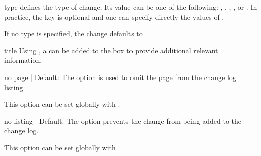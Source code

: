 \documentclass[11pt]{article}
\begin{document}
\begin{Optiondef}{type}{}{}
     defines the type of change. Its value can be one of the following: , , , , or . In practice, the key  is optional and one can specify directly the values of .

    If no type is specified, the change defaults to .
\end{Optiondef}

\begin{PDListing}
\end{PDListing}

\begin{Optiondef}{title}{}{}
    Using , a  can be added to the box to provide additional relevant information.
\end{Optiondef}

\begin{PDListing}
\end{PDListing}


\begin{Optiondef}{no page}{ | }{Default: }
    The  option is used to omit the page from the change log listing.

    This option can be set globally with .
\end{Optiondef}

\begin{PDListing}
\end{PDListing}


\begin{Optiondef}{no listing}{ | }{Default: }
    The  option prevents the change from being added to the change log.

    This option can be set globally with .
\end{Optiondef}
\end{document}
